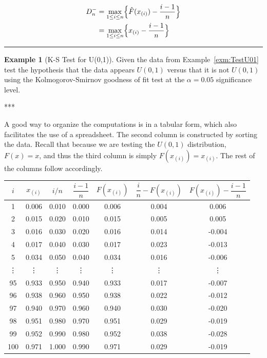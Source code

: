 \documentclass[
]{book}
\theoremstyle{definition}
\theoremstyle{definition}
\newtheorem{example}{Example}[chapter]
\theoremstyle{definition}
\theoremstyle{definition}
\theoremstyle{remark}
\begin{document}
\[
\begin{aligned}
D^{-}_{n}  & = \underset{1 \leq i \leq n}{\max} \Bigl\lbrace \hat{F}(x_{(i)}) - \frac{i-1}{n} \Bigr\rbrace \\
 & = \underset{1 \leq i \leq n}{\max} \Bigl\lbrace x_{(i)} - \frac{i-1}{n} \Bigr\rbrace 
\end{aligned}
\]

\begin{center}\rule{0.5\linewidth}{0.5pt}\end{center}

\begin{example}[K-S Test for U(0,1)]
\protect\hypertarget{exm:TestU01KS}{}{\label{exm:TestU01KS} {} }Given the data from Example~\ref{exm:TestU01} test the hypothesis that the data appears \(U(0,1)\)
versus that it is not \(U(0,1)\) using the Kolmogorov-Smirnov goodness of
fit test at the \(\alpha = 0.05\) significance level.
\end{example}
***

A good way to organize the computations is in a tabular form, which also
facilitates the use of a spreadsheet. The second column is constructed
by sorting the data. Recall that because we are testing the \(U(0,1)\)
distribution, \(F(x) = x\), and thus the third column is simply
\(F(x_{(i)}) = x_{(i)}\). The rest of the columns follow accordingly.\\

\begin{longtable}[]{@{}ccccccc@{}}
\toprule
\(i\) & \(x_{(i)}\) & \(i/n\) & \(\dfrac{i-1}{n}\) & \(F(x_{(i)})\) & \(\dfrac{i}{n}-F(x_{(i)})\) & \(F(x_{(i)})-\dfrac{i-1}{n}\) \\
\midrule
\endhead
1 & 0.006 & 0.010 & 0.000 & 0.006 & 0.004 & 0.006 \\
2 & 0.015 & 0.020 & 0.010 & 0.015 & 0.005 & 0.005 \\
3 & 0.016 & 0.030 & 0.020 & 0.016 & 0.014 & -0.004 \\
4 & 0.017 & 0.040 & 0.030 & 0.017 & 0.023 & -0.013 \\
5 & 0.034 & 0.050 & 0.040 & 0.034 & 0.016 & -0.006 \\
⋮ & ⋮ & ⋮ & ⋮ & ⋮ & ⋮ & ⋮ \\
95 & 0.933 & 0.950 & 0.940 & 0.933 & 0.017 & -0.007 \\
96 & 0.938 & 0.960 & 0.950 & 0.938 & 0.022 & -0.012 \\
97 & 0.940 & 0.970 & 0.960 & 0.940 & 0.030 & -0.020 \\
98 & 0.951 & 0.980 & 0.970 & 0.951 & 0.029 & -0.019 \\
99 & 0.952 & 0.990 & 0.980 & 0.952 & 0.038 & -0.028 \\
100 & 0.971 & 1.000 & 0.990 & 0.971 & 0.029 & -0.019 \\
\bottomrule
\end{longtable}
\end{document}

